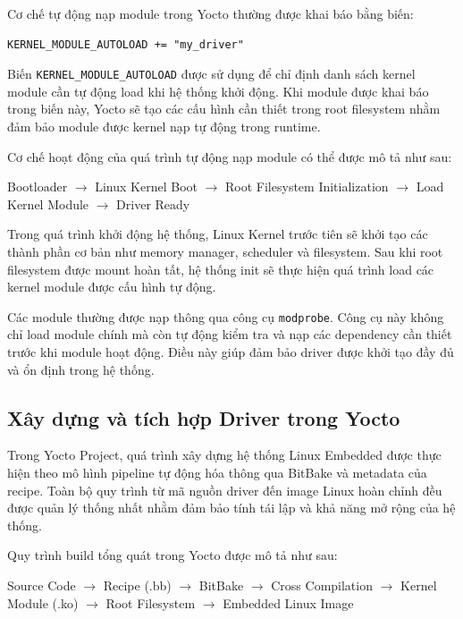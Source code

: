 Cơ chế tự động nạp module trong Yocto thường được khai báo bằng biến:

\begin{verbatim}
KERNEL_MODULE_AUTOLOAD += "my_driver"
\end{verbatim}

Biến \texttt{KERNEL\_MODULE\_AUTOLOAD} được sử dụng để chỉ định danh sách kernel module cần tự động load khi hệ thống khởi động. Khi module được khai báo trong biến này, Yocto sẽ tạo các cấu hình cần thiết trong root filesystem nhằm đảm bảo module được kernel nạp tự động trong runtime.\cite{yocto_kernel_module_autoload}

Cơ chế hoạt động của quá trình tự động nạp module có thể được mô tả như sau:

\begin{flushleft}
\small
Bootloader $\rightarrow$ Linux Kernel Boot $\rightarrow$ Root Filesystem Initialization $\rightarrow$ Load Kernel Module $\rightarrow$ Driver Ready
\end{flushleft}

Trong quá trình khởi động hệ thống, Linux Kernel trước tiên sẽ khởi tạo các thành phần cơ bản như memory manager, scheduler và filesystem. Sau khi root filesystem được mount hoàn tất, hệ thống init sẽ thực hiện quá trình load các kernel module được cấu hình tự động.

Các module thường được nạp thông qua công cụ \texttt{modprobe}. Công cụ này không chỉ load module chính mà còn tự động kiểm tra và nạp các dependency cần thiết trước khi module hoạt động. Điều này giúp đảm bảo driver được khởi tạo đầy đủ và ổn định trong hệ thống.

\subsection{Xây dựng và tích hợp Driver trong Yocto}

Trong Yocto Project, quá trình xây dựng hệ thống Linux Embedded được thực hiện theo mô hình pipeline tự động hóa thông qua BitBake và metadata của recipe. Toàn bộ quy trình từ mã nguồn driver đến image Linux hoàn chỉnh đều được quản lý thống nhất nhằm đảm bảo tính tái lập và khả năng mở rộng của hệ thống.

Quy trình build tổng quát trong Yocto được mô tả như sau:

\begin{flushleft}
\small
Source Code $\rightarrow$ Recipe (.bb) $\rightarrow$ BitBake $\rightarrow$ Cross Compilation $\rightarrow$ Kernel Module (.ko) $\rightarrow$ Root Filesystem $\rightarrow$ Embedded Linux Image
\end{flushleft}

